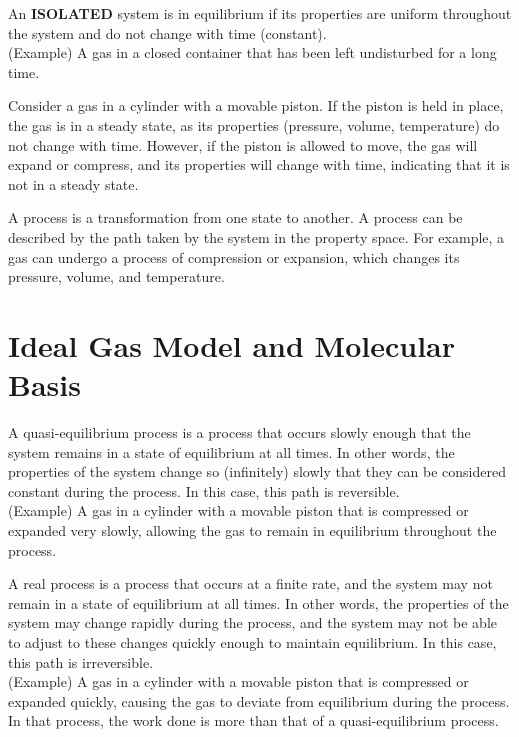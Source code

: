 \documentclass[11pt]{report}
\begin{document}
\begin{definition}[Equilibrium]
    An \textbf{ISOLATED} system is in equilibrium if its properties are uniform throughout the system and do not change with time (constant). \\
    (Example) A gas in a closed container that has been left undisturbed for a long time.
\end{definition}
\begin{example}
    Consider a gas in a cylinder with a movable piston. If the piston is held in place, the gas is in a steady state, as its properties (pressure, volume, temperature) do not change with time. However, if the piston is allowed to move, the gas will expand or compress, and its properties will change with time, indicating that it is not in a steady state. 
\end{example}
\begin{definition}[Process]
    A process is a transformation from one state to another. A process can be described by the path taken by the system in the property space. For example, a gas can undergo a process of compression or expansion, which changes its pressure, volume, and temperature.
\end{definition}

\section{Ideal Gas Model and Molecular Basis}
\begin{definition}
    A quasi-equilibrium process is a process that occurs slowly enough that the system remains in a state of equilibrium at all times. In other words, the properties of the system change so (infinitely) slowly that they can be considered constant during the process. In this case, this path is reversible. \\
    (Example) A gas in a cylinder with a movable piston that is compressed or expanded very slowly, allowing the gas to remain in equilibrium throughout the process.
\end{definition}

\begin{definition}
    A real process is a process that occurs at a finite rate, and the system may not remain in a state of equilibrium at all times. In other words, the properties of the system may change rapidly during the process, and the system may not be able to adjust to these changes quickly enough to maintain equilibrium. In this case, this path is irreversible. \\
    (Example) A gas in a cylinder with a movable piston that is compressed or expanded quickly, causing the gas to deviate from equilibrium during the process. In that process, the work done is more than that of a quasi-equilibrium process.
\end{definition}
\end{document}
